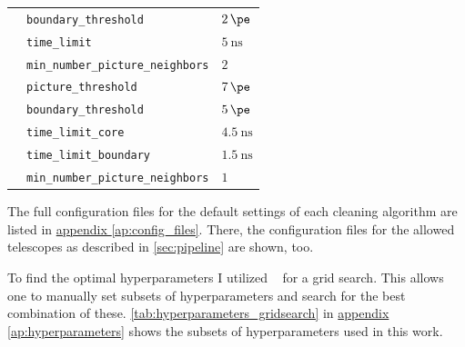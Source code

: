 \begin{table}
{\begin{tabular}{l l l}
                    & \texttt{boundary\_threshold}              & \qquad\(\SI{2}{\pe}\) \\
                    & \texttt{time\_limit}                      & \qquad\(\SI{5}{\nano\second}\) \\
                    & \texttt{min\_number\_picture\_neighbors}  & \qquad\(\num{2}\) \\
        \addlinespace[0.5em]
        \tcc{}      & \texttt{picture\_threshold}               & \qquad\(\SI{7}{\pe}\) \\
                    & \texttt{boundary\_threshold}              & \qquad\(\SI{5}{\pe}\) \\
                    & \texttt{time\_limit\_core}                & \qquad\(\SI{4.5}{\nano\second}\) \\
                    & \texttt{time\_limit\_boundary}            & \qquad\(\SI{1.5}{\nano\second}\) \\
                    & \texttt{min\_number\_picture\_neighbors}  & \qquad\(\num{1}\) \\
  \end{tabular}}
\end{table}

The full configuration files for the default settings of each cleaning algorithm are listed in
\hyperref[ap:config_files]{appendix \ref{ap:config_files}}. There, the configuration files for the allowed telescopes
as described in \autoref{sec:pipeline} are shown, too.

To find the optimal hyperparameters I utilized \sklearn{}~\cite{scikit-learn} for a grid search. This
allows one to manually set subsets of hyperparameters and search for the best combination of these.
\autoref{tab:hyperparameters_gridsearch} in \hyperref[ap:hyperparameters]{appendix \ref{ap:hyperparameters}} shows
the subsets of hyperparameters used in this work.


